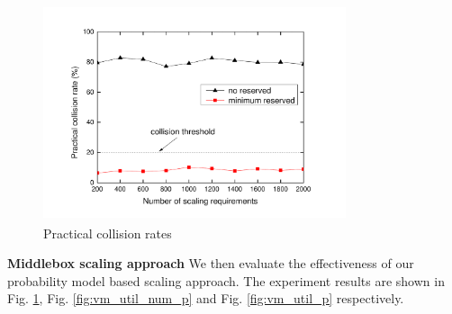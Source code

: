 \documentclass[review]{elsarticle}
\begin{document}
\begin{figure}[H]
	\centering
	\includegraphics[width=3.5in,height=2.5in]{fig/collision_rate_num.pdf}
	\caption{Practical collision rates}
	\label{fig:collision_rate_num}
\end{figure}

\textbf{Middlebox scaling approach}
We then evaluate the effectiveness of our probability model based scaling approach. The experiment results are shown in Fig. \ref{fig:collision_rate_num}, Fig. \ref{fig:vm_util_num_p} and Fig. \ref{fig:vm_util_p} respectively. 
\end{document}
